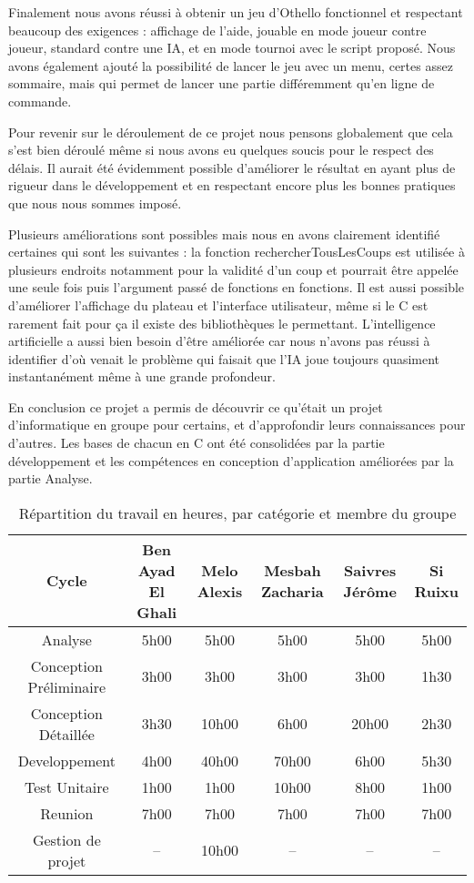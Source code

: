 \hspace{3em}Finalement nous avons réussi à obtenir un jeu d’Othello fonctionnel et respectant beaucoup des exigences : affichage de l’aide, jouable en mode joueur contre joueur, standard contre une IA, et en mode tournoi avec le script proposé. Nous avons également ajouté la possibilité de lancer le jeu avec un menu, certes assez sommaire, mais qui permet de lancer une partie différemment qu’en ligne de commande.

Pour revenir sur le déroulement de ce projet nous pensons globalement que cela s’est bien déroulé même si nous avons eu quelques soucis pour le respect des délais. Il aurait été évidemment possible d’améliorer le résultat en ayant plus de rigueur dans le développement et en respectant encore plus les bonnes pratiques que nous nous sommes imposé.

Plusieurs améliorations sont possibles mais nous en avons clairement identifié certaines qui sont les suivantes : la fonction rechercherTousLesCoups est utilisée à plusieurs endroits notamment pour la validité d’un coup et pourrait être appelée une seule fois puis l’argument passé de fonctions en fonctions. Il est aussi possible d’améliorer l’affichage du plateau et l’interface utilisateur, même si le C est rarement fait pour ça il existe des bibliothèques le permettant. L’intelligence artificielle a aussi bien besoin d’être améliorée car nous n’avons pas réussi à identifier d’où venait le problème qui faisait que l’IA joue toujours quasiment instantanément même à une grande profondeur.



En conclusion ce projet a permis de découvrir ce qu’était un projet d’informatique en groupe pour certains, et d’approfondir leurs connaissances pour d’autres. Les bases de chacun en C ont été consolidées par la partie développement et les compétences en conception d’application améliorées par la partie Analyse.

\begin{table}
\caption{R\'epartition du travail en heures, par catégorie et membre du groupe}\par\medskip
\begin{tabular}{|*{6}{c|}}
    \hline
   	Cycle  & Ben Ayad El Ghali  & Melo Alexis  & Mesbah Zacharia  & Saivres Jérôme  & Si Ruixu \\
    \hline
    Analyse  & 5h00  & 5h00  & 5h00  &  5h00  & 5h00  \\
    \hline
   	Conception Préliminaire & 3h00  & 3h00  & 3h00  & 3h00 & 1h30 \\
    \hline
   	Conception Détaillée & 3h30  & 10h00  & 6h00  & 20h00  & 2h30 \\
    \hline
   	 Developpement & 4h00  & 40h00  &  70h00 & 6h00  & 5h30 \\
    \hline
   	 Test Unitaire  &1h00  & 1h00  & 10h00  & 8h00 & 1h00 \\
    \hline
   	 Reunion  & 7h00  & 7h00  & 7h00  & 7h00 & 7h00 \\
    \hline
   	 Gestion de projet & -- & 10h00  & --  & -- & -- \\
    \hline
\end{tabular}
\end{table}
